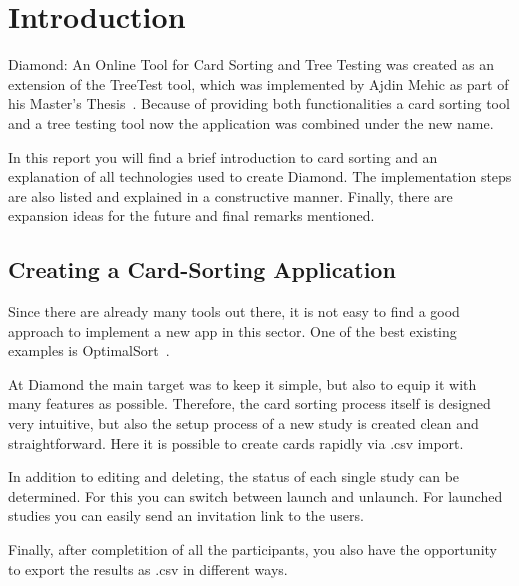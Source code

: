 \chapter{Introduction}

\label{chap:Intro}

Diamond: An Online Tool for Card Sorting and Tree Testing was created as an 
extension of the TreeTest tool, which was implemented by Ajdin Mehic as part 
of his Master's Thesis~\parencite{TreeTest}. 
Because of providing both 
functionalities a card sorting tool and a tree testing tool now the application 
was combined under the new name.

In this report you will find a brief introduction to card sorting and an explanation 
of all technologies used to create Diamond. The implementation steps are also 
listed and explained in a constructive manner. Finally, there are expansion 
ideas for the future and final remarks mentioned.


\section{Creating a Card-Sorting Application}

Since there are already many tools out there, it is not easy to find a good 
approach to implement a new app in this sector. One of the best existing 
examples is OptimalSort~\parencite{OptimalSort}.

At Diamond the main target was to keep it simple, but also to equip it with
many features as possible. Therefore, the card sorting process itself is 
designed very intuitive, but also the setup process of a new study is created 
clean and straightforward. Here it is possible to create cards rapidly via 
.csv import.

In addition to editing and deleting, the status of each single study can be 
determined. For this you can switch between launch and unlaunch. For
launched studies you can easily send an invitation link to the users.

Finally, after completition of all the participants, you also have the opportunity 
to export the results as .csv in different ways.

